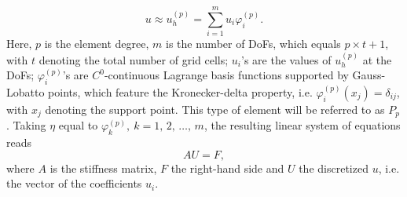 \documentclass[review,3p]{elsarticle}
\newcommand{\apostrophe}[1]{\rq{#1}}			%
\begin{document}
\begin{equation}
 u \approx u_h ^{(p)} = \sum _ {i=1} ^{m} u _{i} \varphi _{i}^{(p)}. \label{General_SM_u_approx}%
\end{equation}
Here, $p$ is the element degree, $m$ is the number of DoFs, which equals $p \times t + 1$, with $t$ denoting the total number of grid cells; $u_i$\apostrophe s are the values of $u_h^{(p)}$ at the DoFs; $\varphi _{i}^{(p)}$\apostrophe s are $C^0$-continuous Lagrange basis functions supported by Gauss-Lobatto points, which feature the Kronecker-delta property, i.e. $\varphi _{i}^{(p)} (x_j)=\delta_{ij}$, with $x_j$ denoting the support point. This type of element will be referred to as $P_p$. Taking $\eta$ equal to $\varphi ^{(p)}_{k},~ k=1, \,2, \, \ldots , \, m$, the resulting linear system of equations reads
\begin{equation}
 A {U} = F,				\label{matrix equation std FEM}
\end{equation}
where $A$ is the stiffness matrix, $F$ the right-hand side and $U$ the discretized $u$, i.e. the vector of the coefficients $u_i$.
\end{document}
